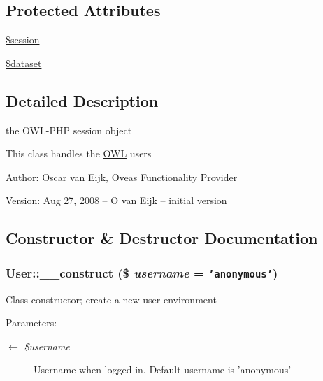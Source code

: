 \subsection*{Protected Attributes}
\begin{CompactItemize}
\item 
\hyperlink{classUserHandler_f097b7fd1ee085b46a6c34e071508a7f}{\$session}
\item 
\hyperlink{classUserHandler_c38c1ea50b2820ed03781bdbe8eb2e08}{\$dataset}
\end{CompactItemize}


\subsection{Detailed Description}
the OWL-PHP session object 

This class handles the \hyperlink{classOWL}{OWL} users \begin{Desc}
\item[Author:]Oscar van Eijk, Oveas Functionality Provider \end{Desc}
\begin{Desc}
\item[Version:]Aug 27, 2008 -- O van Eijk -- initial version \end{Desc}


\subsection{Constructor \& Destructor Documentation}
\hypertarget{classUser_16b171e344993f5d4c3aa8cddcfc8050}{
\subsubsection{\setlength{\rightskip}{0pt plus 5cm}User::\_\-\_\-construct (\$ {\em username} = {\tt 'anonymous'})}}
\label{classUser_16b171e344993f5d4c3aa8cddcfc8050}


Class constructor; create a new user environment

\begin{Desc}
\item[Parameters:]
\begin{description}
\item[\mbox{$\leftarrow$} {\em \$username}]Username when logged in. Default username is 'anonymous' \end{description}
\end{Desc}


